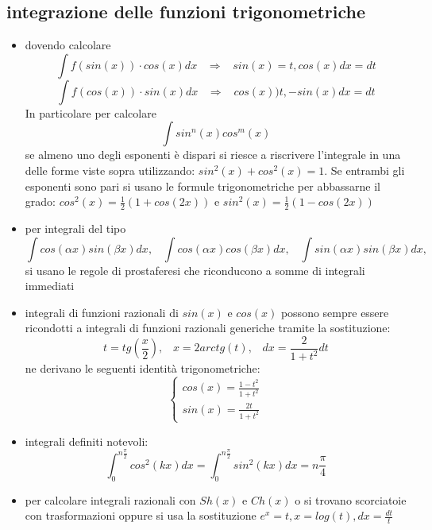 \subsection{integrazione delle funzioni trigonometriche}
\begin{itemize}
    \item dovendo calcolare
    \[
        \int f(sin(x)) \cdot  cos(x) dx \;\;\; \Rightarrow  \;\;\; sin(x) = t, cos(x) dx =dt
    \]
    \[
        \int f(cos(x)) \cdot  sin(x) dx\;\;\; \Rightarrow  \;\;\; cos(x) ) t, -sin(x) dx = dt
    \]
    In particolare per calcolare 
    \[
        \int sin^n(x) cos^m(x)
    \]
    se almeno uno degli esponenti è dispari si riesce a riscrivere l'integrale in una delle forme viste sopra utilizzando: $sin^2(x) + cos^2(x) = 1$. Se entrambi gli esponenti sono pari si usano le formule trigonometriche per abbassarne il grado: $cos^2(x) = \frac{1}{2}(1+cos(2x))$ e $sin^2(x) = \frac{1}{2} (1-cos(2x))$
    \item per integrali del tipo
    \[
        \int cos(\alpha x) sin(\beta x) dx, \;\;\;\int cos(\alpha x) cos(\beta x) dx, \;\;\;\int sin(\alpha x) sin(\beta x) dx,
    \]
    si usano le regole di prostaferesi che riconducono a somme di integrali immediati
    \item integrali di funzioni razionali di $sin(x)$ e $cos(x)$ possono sempre essere ricondotti a integrali di funzioni razionali generiche tramite la sostituzione:
    \[
        t = tg\left(\frac{x}{2}\right), \;\;\; x= 2 arctg(t), \;\;\;dx = \frac{2}{1+t^2}dt
    \]
    ne derivano le seguenti identità trigonometriche:
    \[
        \begin{cases}
            cos(x) = \frac{1-t^2}{1+t^2}\\
            sin(x) = \frac{2t}{1+t^2}
        \end{cases}
    \]
    \item integrali definiti notevoli:
    \[
        \int_{0}^{n \frac{\pi}{2}}cos^2(kx) dx = \int_{0}^{n \frac{\pi}{2}}sin^2(kx) dx = n \frac{\pi}{4}
    \]
    \item per calcolare integrali razionali con $Sh(x)$ e $Ch(x)$ o si trovano scorciatoie con trasformazioni oppure si usa la sostituzione $e^x = t, x= log(t), dx = \frac{dt}{t}$
\end{itemize}
